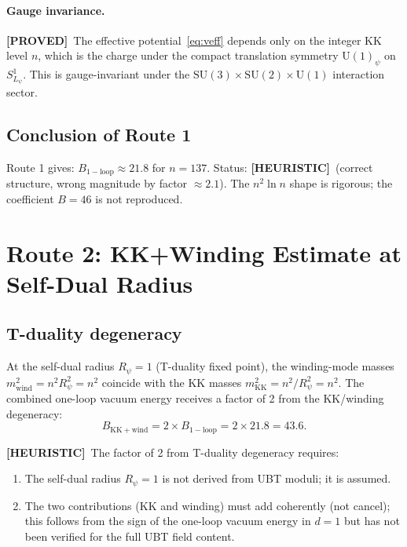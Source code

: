\documentclass[12pt,a4paper]{article}
\theoremstyle{definition}
\theoremstyle{remark}
\newcommand{\proved}{\textcolor{green!55!black}{\textbf{[PROVED]}}}
\newcommand{\heur}{\textcolor{orange!80!black}{\textbf{[HEURISTIC]}}}
\begin{document}
\paragraph{Gauge invariance.}
\proved\ The effective potential~\eqref{eq:veff} depends only on the integer KK
level $n$, which is the charge under the compact translation symmetry
$\mathrm{U}(1)_\psi$ on $S^1_{L_\psi}$.  This is gauge-invariant under the
$\mathrm{SU}(3)\times\mathrm{SU}(2)\times\mathrm{U}(1)$ interaction sector.

\subsection{Conclusion of Route 1}

\begin{resultbox}
Route 1 gives: $B_{\mathrm{1-loop}} \approx 21.8$ for $n = 137$.
Status: \heur\ (correct structure, wrong magnitude by factor $\approx 2.1$).
The $n^2\ln n$ shape is rigorous; the coefficient $B = 46$ is not reproduced.
\end{resultbox}

\section{Route 2: KK+Winding Estimate at Self-Dual Radius}
\label{sec:kk_winding}

\subsection{T-duality degeneracy}

At the self-dual radius $R_\psi = 1$ (T-duality fixed point), the winding-mode
masses $m_{\mathrm{wind}}^2 = n^2 R_\psi^2 = n^2$ coincide with the KK masses
$m_{\mathrm{KK}}^2 = n^2/R_\psi^2 = n^2$.  The combined one-loop vacuum energy
receives a factor of 2 from the KK/winding degeneracy:
\begin{equation}
  B_{\mathrm{KK+wind}} = 2 \times B_{\mathrm{1-loop}} = 2 \times 21.8 = 43.6.
  \label{eq:Bkkwind}
\end{equation}

\heur\ The factor of 2 from T-duality degeneracy requires:
\begin{enumerate}
  \item The self-dual radius $R_\psi = 1$ is not derived from UBT moduli; it
        is assumed.
  \item The two contributions (KK and winding) must add coherently (not cancel);
        this follows from the sign of the one-loop vacuum energy in $d=1$ but has
        not been verified for the full UBT field content.
\end{enumerate}
\end{document}
